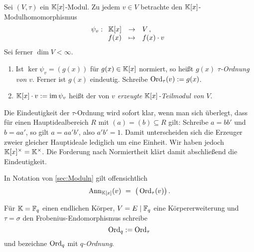 \begin{definition}
  \label{def:tau_ordnung}
  Sei $(V,\tau)$ ein $\mathbb{K}[x]$-Modul. Zu jedem $v \in V$ betrachte den
  $\mathbb{K}[x]$-Modulhomomorphismus
  \[ \psi_v: \funcdef{\K[x] & \to & V\,, \\
    f(x) & \mapsto & f(x)\cdot v }  \]
  Sei ferner $\dim V < \infty$.
  \begin{enumerate}
    \item Ist $\ker\psi_v = (g(x))$ für $g(x)\in \mathbb{K}[x]$ normiert, so heißt
      $g(x)$ \emph{$\tau$-Ordnung von $v$}\@. Ferner ist $g(x)$ eindeutig.
      Schreibe $\operatorname{Ord}_\tau(v) := g(x)$.
    \item $\mathbb{K}[x]\cdot v := \operatorname{im}{\psi_v}$ heißt der von \emph{$v$ erzeugte
      $\mathbb{K}[x]$-Teilmodul von $V$}.
  \end{enumerate}
\end{definition}

\begin{bemerkung}
  Die Eindeutigkeit der $\tau$-Ordnung wird sofort klar, wenn man sich
  überlegt, dass für einen Hauptidealbereich $R$ mit $(a) = (b) \subseteq R$ 
  gilt: Schreibe $a = b b'$ und $b = a a'$, so gilt $a = a a'b'$, also 
  $a'b' = 1$. Damit unterscheiden sich die Erzeuger zweier gleicher Hauptideale
  lediglich um eine Einheit. Wir haben jedoch $\mathbb{K}[x]^\times = \mathbb{K}^\times$. Die
  Forderung nach Normiertheit klärt damit abschließend die Eindeutigkeit.
\end{bemerkung}


\begin{bemerkung}
  In Notation von \autoref{sec:Moduln} gilt offensichtlich
  \[ \operatorname{Ann}_{\mathbb{K}[x]}(v) \ =\  \big(\operatorname{Ord}_\tau(v)\big) \,.\]
\end{bemerkung}

\begin{notation}
  Für $\mathbb{K} = \mathbb{F}_q$ einen endlichen Körper, $V = E \mid \mathbb{F}_q$ eine 
  Körpererweiterung und $\tau = \sigma$ den Frobenius-Endomorphismus schreibe
  \[ \operatorname{Ord}_q := \operatorname{Ord}_\tau \]
  und bezeichne $\operatorname{Ord}_q$ mit \emph{$q$-Ordnung}.
\end{notation}

